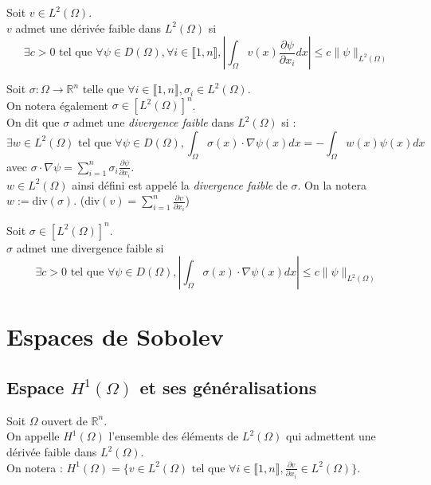 \documentclass[12pt,a4paper]{article}
\newcommand{\propriete}[2]{%
    \begin{tcolorbox}[colback=white,colframe=green!25!white,title=\textbf{Propriété #1}, coltitle=black]
        #2
    \end{tcolorbox}
}
\newcommand{\definition}[2]{%
    \begin{tcolorbox}[colback=white,colframe=blue!25!white,title=\textbf{Définition #1}, coltitle=black]
        #2
    \end{tcolorbox}
}
\begin{document}
\propriete{}{
    Soit $v \in L^2(\Omega)$. \\
    $v$ admet une dérivée faible dans $L^2(\Omega)$ si
    $$
    \exists c > 0 \text{ tel que } \forall \psi \in D(\Omega), \forall i \in \llbracket 1, n \rrbracket, \left| \int_{\Omega} v(x) \frac{\partial \psi}{\partial x_i} dx \right| \leq c \| \psi \|_{L^2(\Omega)}
    $$
}

\definition{- Divergence faible}{
    Soit $\sigma : \Omega \rightarrow \mathbb{R}^n$ telle que $\forall i \in \llbracket 1, n \rrbracket, \sigma_i \in L^2(\Omega)$. \\
    On notera également $\sigma \in \left[L^2(\Omega)\right]^n$. \\
    On dit que $\sigma$ admet une \textit{divergence faible} dans $L^2(\Omega)$ si :
    $$
    \exists w \in L^2(\Omega) \text{ tel que } \forall \psi \in D(\Omega), \int_{\Omega} \sigma(x) \cdot \nabla \psi(x) dx = - \int_{\Omega} w(x) \psi(x) dx
    $$
    avec $\sigma \cdot \nabla \psi = \sum_{i=1}^n \sigma_i \frac{\partial \psi}{\partial x_i}$. \\

    $w \in L^2(\Omega)$ ainsi défini est appelé la \textit{divergence faible} de $\sigma$. On la notera $w := \text{div}(\sigma)$. ($\text{div}(v) = \sum_{i=1}^n \frac{\partial v}{\partial x_i}$)
}

\propriete{}{
    Soit $\sigma \in \left[L^2(\Omega)\right]^n$. \\
    $\sigma$ admet une divergence faible si
    $$
    \exists c > 0 \text{ tel que } \forall \psi \in D(\Omega), \left| \int_{\Omega} \sigma(x) \cdot \nabla \psi(x) dx \right| \leq c \| \psi \|_{L^2(\Omega)}
    $$
}


\section{Espaces de Sobolev}

\subsection{Espace $H^1(\Omega)$ et ses généralisations}

\definition{}{
    Soit $\Omega$ ouvert de $\mathbb{R}^n$. \\
    On appelle $H^1(\Omega)$ l'ensemble des éléments de $L^2(\Omega)$ qui admettent une dérivée faible dans $L^2(\Omega)$. \\
    On notera : $H^1(\Omega) = \{v \in L^2(\Omega) \text{ tel que } \forall i \in \llbracket 1, n \rrbracket, \frac{\partial v}{\partial x_i} \in L^2(\Omega)\}$.
}
\end{document}
